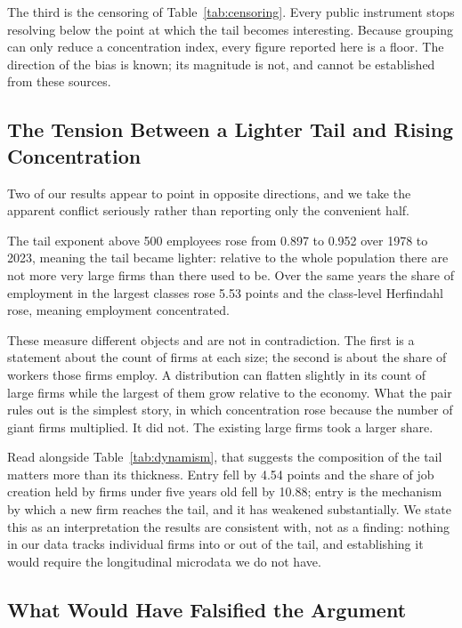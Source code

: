 \documentclass[jrfm,article,submit,pdftex,moreauthors]{Definitions/mdpi}
\begin{document}
The third is the censoring of Table~\ref{tab:censoring}. Every public instrument stops
resolving below the point at which the tail becomes interesting. Because grouping can only
reduce a concentration index, every figure reported here is a floor. The direction of the
bias is known; its magnitude is not, and cannot be established from these sources.

\subsection{The Tension Between a Lighter Tail and Rising Concentration}
\label{subsec:tension}

Two of our results appear to point in opposite directions, and we take the apparent conflict
seriously rather than reporting only the convenient half.

The tail exponent above 500 employees rose from 0.897 to 0.952 over 1978 to 2023, meaning the
tail became lighter: relative to the whole population there are not more very large firms
than there used to be. Over the same years the share of employment in the largest classes
rose 5.53 points and the class-level Herfindahl rose, meaning employment concentrated.

These measure different objects and are not in contradiction. The first is a statement about
the count of firms at each size; the second is about the share of workers those firms employ.
A distribution can flatten slightly in its count of large firms while the largest of them
grow relative to the economy. What the pair rules out is the simplest story, in which
concentration rose because the number of giant firms multiplied. It did not. The existing
large firms took a larger share.

Read alongside Table~\ref{tab:dynamism}, that suggests the composition of the tail matters
more than its thickness. Entry fell by 4.54 points and the share of job creation held by
firms under five years old fell by 10.88; entry is the mechanism by which a new firm reaches
the tail, and it has weakened substantially. We state this as an interpretation the results
are consistent with, not as a finding: nothing in our data tracks individual firms into or
out of the tail, and establishing it would require the longitudinal microdata we do not
have.

\subsection{What Would Have Falsified the Argument}
\label{subsec:falsify}
\end{document}
